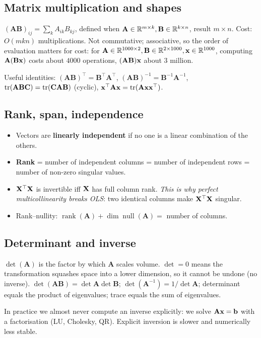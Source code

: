 \subsection{Matrix multiplication and shapes}
$(\mathbf{A}\mathbf{B})_{ij}=\sum_k A_{ik}B_{kj}$, defined when $\mathbf{A}\in\mathbb{R}^{m\times k},\mathbf{B}\in\mathbb{R}^{k\times n}$, result $m\times n$. Cost: $O(mkn)$ multiplications. Not commutative; associative, so the order of evaluation matters for cost: for $\mathbf{A}\in\mathbb{R}^{1000\times 2},\mathbf{B}\in\mathbb{R}^{2\times1000},\mathbf{x}\in\mathbb{R}^{1000}$, computing $\mathbf{A}(\mathbf{B}\mathbf{x})$ costs about $4000$ operations, $(\mathbf{AB})\mathbf{x}$ about $3$ million.

Useful identities: $(\mathbf{AB})^\top=\mathbf{B}^\top\mathbf{A}^\top$, $(\mathbf{AB})^{-1}=\mathbf{B}^{-1}\mathbf{A}^{-1}$, $\operatorname{tr}(\mathbf{ABC})=\operatorname{tr}(\mathbf{CAB})$ (cyclic), $\mathbf{x}^\top\mathbf{A}\mathbf{x}=\operatorname{tr}(\mathbf{A}\mathbf{x}\mathbf{x}^\top)$.

\subsection{Rank, span, independence}
\begin{itemize}
  \item Vectors are \textbf{linearly independent} if no one is a linear combination of the others.
  \item \textbf{Rank} = number of independent columns = number of independent rows = number of non-zero singular values.
  \item $\mathbf{X}^\top\mathbf{X}$ is invertible iff $\mathbf{X}$ has full column rank. \emph{This is why perfect multicollinearity breaks OLS}: two identical columns make $\mathbf{X}^\top\mathbf{X}$ singular.
  \item Rank--nullity: $\operatorname{rank}(\mathbf{A})+\dim\operatorname{null}(\mathbf{A})=$ number of columns.
\end{itemize}

\subsection{Determinant and inverse}
$\det(\mathbf{A})$ is the factor by which $\mathbf{A}$ scales volume. $\det=0$ means the transformation squashes space into a lower dimension, so it cannot be undone (no inverse). $\det(\mathbf{AB})=\det\mathbf{A}\det\mathbf{B}$; $\det(\mathbf{A}^{-1})=1/\det\mathbf{A}$; determinant equals the product of eigenvalues; trace equals the sum of eigenvalues.

In practice we almost never compute an inverse explicitly: we solve $\mathbf{A}\mathbf{x}=\mathbf{b}$ with a factorisation (LU, Cholesky, QR). Explicit inversion is slower and numerically less stable.

